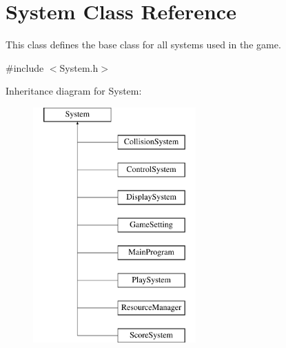\hypertarget{class_system}{}\section{System Class Reference}
\label{class_system}


This class defines the base class for all systems used in the game.  




{\ttfamily \#include $<$System.\+h$>$}

Inheritance diagram for System\+:\begin{figure}[H]
\begin{center}
\leavevmode
\includegraphics[height=9.000000cm]{class_system}
\end{center}
\end{figure}
